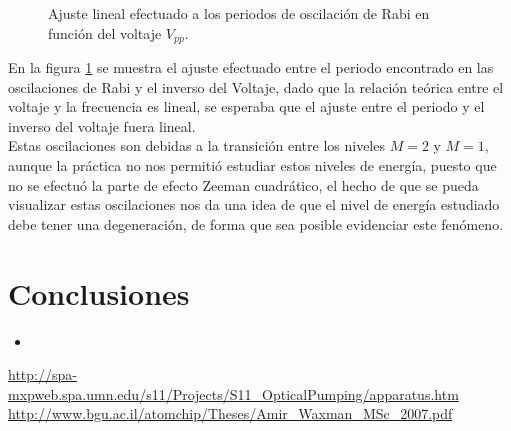 \documentclass[%
 reprint,
 amsmath,amssymb,
 aps,
]{revtex4-1}
\begin{document}
\begin{figure}[h]
\caption{\label{Volt_periodo} Ajuste lineal efectuado a los periodos de oscilación de Rabi en función del voltaje $V_{pp}$.}
\end{figure}
En la figura \ref{Volt_periodo} se muestra el ajuste efectuado entre el periodo encontrado en las oscilaciones de Rabi y el inverso del Voltaje, dado que la relación teórica entre el voltaje y la frecuencia es lineal\cite{teoria de rabi}, se esperaba que el ajuste entre el periodo y el inverso del voltaje fuera lineal.\\
Estas oscilaciones son debidas a la transición entre los niveles $M=2$ y $M=1$, aunque la práctica no nos permitió estudiar estos niveles de energía, puesto que no se efectuó la parte de efecto Zeeman cuadrático, el hecho de que se pueda visualizar estas oscilaciones nos da una idea de que el nivel de energía estudiado debe tener una degeneración, de forma que sea posible evidenciar este fenómeno.

\section{Conclusiones}
\begin{itemize}
    \item 
\end{itemize}

\begin{thebibliography}{9}
\url{http://spa-mxpweb.spa.umn.edu/s11/Projects/S11_OpticalPumping/apparatus.htm}
\url{http://www.bgu.ac.il/atomchip/Theses/Amir_Waxman_MSc_2007.pdf}
\end{thebibliography}
\end{document}
